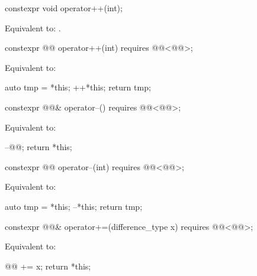 \begin{itemdecl}
constexpr void operator++(int);
\end{itemdecl}

\begin{itemdescr}
\pnum
\effects
Equivalent to: .
\end{itemdescr}

\begin{itemdecl}
constexpr @@ operator++(int) requires @@<@@>;
\end{itemdecl}

\begin{itemdescr}
\pnum
\effects
Equivalent to:
\begin{codeblock}
auto tmp = *this;
++*this;
return tmp;
\end{codeblock}
\end{itemdescr}

\begin{itemdecl}
constexpr @@& operator--() requires @@<@@>;
\end{itemdecl}

\begin{itemdescr}
\pnum
\effects
Equivalent to:
\begin{codeblock}
--@@;
return *this;
\end{codeblock}
\end{itemdescr}

\begin{itemdecl}
constexpr @@ operator--(int) requires @@<@@>;
\end{itemdecl}

\begin{itemdescr}
\pnum
\effects
Equivalent to:
\begin{codeblock}
auto tmp = *this;
--*this;
return tmp;
\end{codeblock}
\end{itemdescr}

\begin{itemdecl}
constexpr @@& operator+=(difference_type x)
  requires @@<@@>;
\end{itemdecl}

\begin{itemdescr}
\pnum
\effects
Equivalent to:
\begin{codeblock}
@@ += x;
return *this;
\end{codeblock}
\end{itemdescr}

